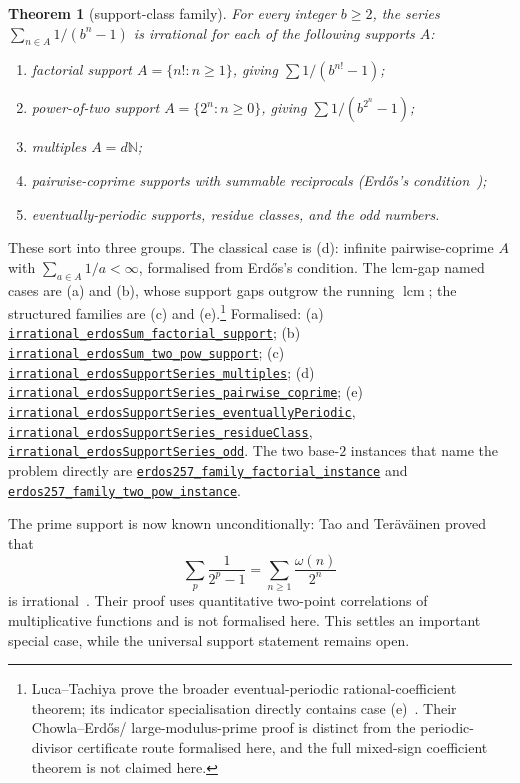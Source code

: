 \documentclass[11pt]{article}
\newcommand{\commit}{81150c1c6fdd4cd51e76d3aa0de344341e0e9e7c}
\newcommand{\repobase}{https://github.com/wcook04/plectis-lean-erdos249-257/blob/\commit}
\newcommand{\PK}{Erdos249257}
\newcommand{\lrefx}[3]{\href{\repobase/\PK/#1\#L#2}{\nolinkurl{#3}}}
\newtheorem{theorem}{Theorem}[section]
\theoremstyle{definition}
\theoremstyle{remark}
\newcommand{\N}{\mathbb{N}}
\newcommand{\lcm}{\operatorname{lcm}}
\begin{document}
\begin{theorem}[support-class family]\label{res:support}
For every integer $b\ge2$, the series $\sum_{n\in A} 1/(b^n-1)$ is irrational for
each of the following supports $A$:
\begin{enumerate}[label=\textup{(\alph*)},leftmargin=2em]
\item factorial support $A=\{n! : n\ge1\}$, giving $\sum 1/(b^{n!}-1)$;
\item power-of-two support $A=\{2^n : n\ge0\}$, giving $\sum 1/(b^{2^n}-1)$;
\item multiples $A=d\N$;
\item pairwise-coprime supports with summable reciprocals (Erd\H{o}s's
condition~\cite{erdos1968});
\item eventually-periodic supports, residue classes, and the odd numbers.
\end{enumerate}
\end{theorem}
\noindent These sort into three groups. The classical case is (d): infinite
pairwise-coprime $A$ with $\sum_{a\in A}1/a<\infty$, formalised from Erd\H{o}s's
condition. The lcm-gap named cases are (a) and (b), whose support gaps outgrow the
running $\lcm$; the structured families are (c) and (e).\footnote{Luca--Tachiya
prove the broader eventual-periodic rational-coefficient theorem; its indicator
specialisation directly contains case (e)~\cite{lucatachiya}. Their Chowla--Erd\H{o}s/
large-modulus-prime proof is distinct from the periodic-divisor certificate route
formalised here, and the full mixed-sign coefficient theorem is not claimed here.}
Formalised: (a)
\lrefx{CertificateKernel.lean}{5707}{irrational_erdosSum_factorial_support};
(b) \lrefx{CertificateKernel.lean}{5731}{irrational_erdosSum_two_pow_support};
(c) \lrefx{CertificateKernel.lean}{8775}{irrational_erdosSupportSeries_multiples};
(d) \lrefx{CertificateKernel.lean}{10448}{irrational_erdosSupportSeries_pairwise_coprime};
(e) \lrefx{CertificateKernel.lean}{11276}{irrational_erdosSupportSeries_eventuallyPeriodic},
\lrefx{CertificateKernel.lean}{11344}{irrational_erdosSupportSeries_residueClass},
\lrefx{CertificateKernel.lean}{11358}{irrational_erdosSupportSeries_odd}. The two
base-$2$ instances that name the problem directly are
\lrefx{CertificateKernel.lean}{5754}{erdos257_family_factorial_instance} and
\lrefx{CertificateKernel.lean}{5762}{erdos257_family_two_pow_instance}.

The prime support is now known unconditionally: Tao and Ter\"av\"ainen proved
that
\[
  \sum_p\frac1{2^p-1}=\sum_{n\ge1}\frac{\omega(n)}{2^n}
\]
is irrational~\cite{taoteravainen}. Their proof uses quantitative two-point
correlations of multiplicative functions and is not formalised here. This
settles an important special case, while the universal support statement
remains open.
\end{document}
